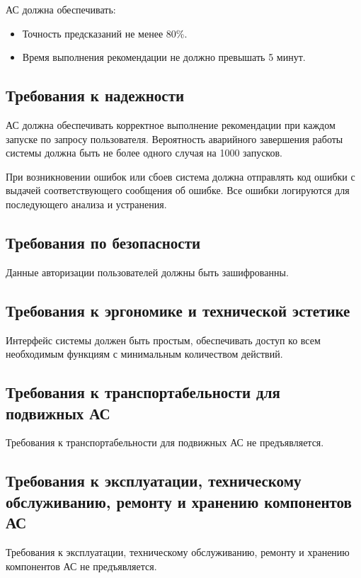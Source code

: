АС должна обеспечивать:

\begin{itemize}
	\item Точность предсказаний не менее 80\%.
	\item Время выполнения рекомендации не должно превышать 5 минут.
\end{itemize}

\subsection{Требования к надежности}

АС должна обеспечивать корректное выполнение рекомендации
при каждом запуске по запросу пользователя.
Вероятность аварийного завершения работы системы должна быть
не более одного случая на 1000 запусков.

При возникновении ошибок или сбоев система должна отправлять код ошибки
с выдачей соответствующего сообщения об ошибке.
Все ошибки логируются для последующего анализа и устранения.

\subsection{Требования по безопасности}

Данные авторизации пользователей должны быть зашифрованны.

\subsection{Требования к эргономике и технической эстетике}

Интерфейс системы должен быть простым,
обеспечивать доступ ко всем необходимым функциям
с минимальным количеством действий.

\subsection{Требования к транспортабельности для подвижных АС}

Требования к транспортабельности для подвижных АС
не предъявляется.

\subsection{Требования к эксплуатации, техническому обслуживанию,
	ремонту и хранению компонентов АС}

Требования к эксплуатации, техническому обслуживанию,
ремонту и хранению компонентов АС не предъявляется.


